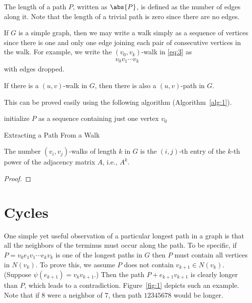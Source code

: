 \documentclass[thmcnt=section, 12pt, color=cyan]{my-elegantbook}
\begin{document}
The length of a path $P$, written as $\abs{P}$, is defined as the number of edges along it. Note that the length of a trivial path is zero since there are no edges.

If $G$ is a simple graph, then we may write a walk simply as a sequence of vertices since there is one and only one edge joining each pair of consecutive vertices in the walk. For example, we write the $(v_0, v_k)$-walk in \eqref{eq:3} as 
\begin{align*}
    v_0 v_1 \cdots v_k
\end{align*}
with edges dropped.


\begin{proposition}
    If there is a $(u, v)$-walk in $G$, then there is also a $(u, v)$-path in $G$.
\end{proposition}

This can be proved easily using the following algorithm (Algorithm~\ref{alg:1}).

\begin{algorithm}[ht]
    initialize $P$ as a sequence containing just one vertex $v_0$ \;
    \caption{Extracting a Path From a Walk}
    \label{alg:1}
\end{algorithm}


\begin{proposition}
    The number $(v_i, v_j)$-walks of length $k$ in $G$ is the $(i,j)$-th entry of the $k$-th power of the adjacency matrix $A$, i.e., $A^k$.
\end{proposition}

\begin{proof}
\end{proof}


\section{Cycles}


One simple yet useful observation of a particular longest path in a graph is that all the neighbors of the terminus must occur along the path. To be specific, if $P = v_0 e_1 v_1 \cdots e_k v_k$ is one of the longest paths in $G$ then $P$ must contain all vertices in $N(v_k)$. To prove this, we assume $P$ does not contain $v_{k+1} \in N(v_k)$. (Suppose $\psi(e_{k+1}) = v_k v_{k+1}$.) Then the path $P + e_{k+1}v_{k+1}$ is clearly longer than $P$, which leads to a contradiction. Figure~\ref{fig:1} depicts such an example. Note that if $8$ were a neighbor of $7$, then path $12345678$ would be longer.
\end{document}
